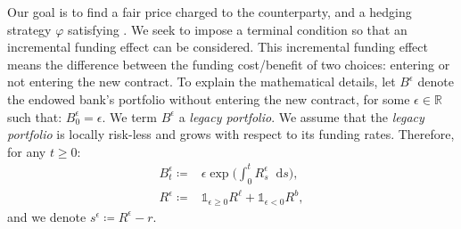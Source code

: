 \documentclass[a4paper, 11pt]{article}              %
\numberwithin{equation}{section}
\theoremstyle{plain}
\newcommand{\1}{\mathds{1}}
\newcommand{\dsR}{\mathbb{R}}
\theoremstyle{plain}
\theoremstyle{definition}
\theoremstyle{plain}
\newcommand*\df{\mathop{}\!\mathrm{d}}
\begin{document}
Our goal is to find a fair price charged to the counterparty, and a hedging
strategy $\varphi$ satisfying . We seek to impose a terminal
condition so that an incremental funding effect can be considered. This
incremental funding effect means the difference between the funding cost/benefit
of two choices: entering or not entering the new contract. To explain the
mathematical details, let $B^\epsilon$ denote the endowed bank's portfolio
without entering the new contract, for some $\epsilon \in \dsR$ such that:
$B^\epsilon_{0} = \epsilon$. We term $B^\epsilon$ a \textit{legacy
  portfolio}. We assume that the \textit{legacy portfolio} is locally risk-less
and grows with respect to its funding rates. Therefore, for any $t \geq0$:
\begin{align}
  B^\epsilon_t \coloneqq & \epsilon\exp{\Big(\int_{0}^{t}R^\epsilon_s \df s\Big)},  \nonumber\\
  R^\epsilon \coloneqq &\1_{\epsilon \geq0} R^\ell +   \1_{\epsilon <0} R^b,\nonumber
\end{align}
and we denote $s^\epsilon\coloneqq R^\epsilon -r$.
\end{document}
